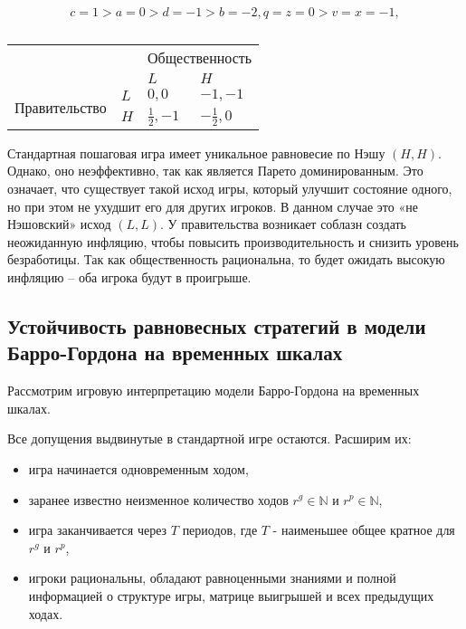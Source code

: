 \begin{equation}
\label{eq:sec:ot:exampleConstraint}
c=1 > a=0 > d=-1 > b=-2, q=z=0 > v=x=-1,
\end{equation}

\begin{table}[h]
	\centering
	\begin{tabular}{|l|l|l|l|}
		\hline
		\multicolumn{2}{|l|}{\multirow{2}{*}{}} & \multicolumn{2}{l|}{Общественность} \\ \cline{3-4} 
		\multicolumn{2}{|l|}{}                  & $L$            & $H$            \\ \hline
		\multirow{2}{*}{Правительство}     & $L$     & $0,0$          & $-1,-1$          \\ \cline{2-4} 
		& $H$     & $\frac{1}{2},-1$          & $-\frac{1}{2},0$          \\ \hline
	\end{tabular}
		\caption{}	
		
	\label{table:sec:ot:real}
\end{table}


Стандартная пошаговая игра имеет уникальное равновесие по Нэшу $(H,H)$. Однако, оно неэффективно, так как является Парето доминированным. Это означает, что существует такой исход игры, который улучшит состояние одного, но при этом не ухудшит его для других игроков. В данном случае это «не Нэшовский» исход $(L,L)$.  У правительства возникает соблазн создать неожиданную инфляцию, чтобы повысить производительность и снизить уровень безработицы. Так как общественность рациональна, то будет ожидать высокую инфляцию – оба игрока будут в проигрыше. 


\subsection{Устойчивость равновесных стратегий в модели Барро-Гордона на
	временных шкалах} 

Рассмотрим игровую интерпретацию модели Барро-Гордона на временных шкалах.

Все допущения выдвинутые в стандартной игре остаются. Расширим их:
\begin{itemize}
	\item игра начинается одновременным ходом, 
	\item заранее известно неизменное количество ходов $r^g \in \mathbb{N}$ и $r^p \in \mathbb{N}$,
	\item игра заканчивается через $T$ периодов, где $T$ - наименьшее общее кратное для $r^g$ и $r^p$,
	\item игроки рациональны, обладают равноценными знаниями и полной информацией о структуре игры, матрице выигрышей и всех предыдущих ходах.
\end{itemize}


